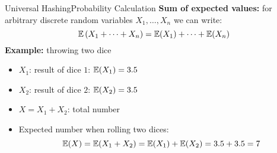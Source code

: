 


\begin{frame}{Universal Hashing}{Probability Calculation}
   \textbf{Sum of expected values:}
   for arbitrary discrete random variables {\color{MainA}$X_1,\dots,X_n$} we can write:
     {\color{MainA}\[\mathbb{E}\left(X_1+\dots+X_n\right)
       = \mathbb{E}(X_1) + \dots + \mathbb{E}(X_n)\]}
   \textbf{Example:} throwing two dice
   \begin{itemize}
     \item<3->
       {\color{MainA}$X_1$}: result of dice {\color{MainA}$1$}: {\color{MainA}$\mathbb{E}(X_1) = 3.5$}
     \item<4->
       {\color{MainA}$X_2$}: result of dice {\color{MainA}$2$}: {\color{MainA}$\mathbb{E}(X_2) = 3.5$}
     \item<5->
       {\color{MainA}$X = X_1 + X_2$}:  total number
     \item<5-> Expected number when rolling two dices: 
       {\color{MainA}\[\mathbb{E}(X)
         = \mathbb{E}(X_1 + X_2)
         = \mathbb{E}(X_1) + \mathbb{E}(X_2) = 3.5 + 3.5 = 7\]}
   \end{itemize}
\end{frame}

